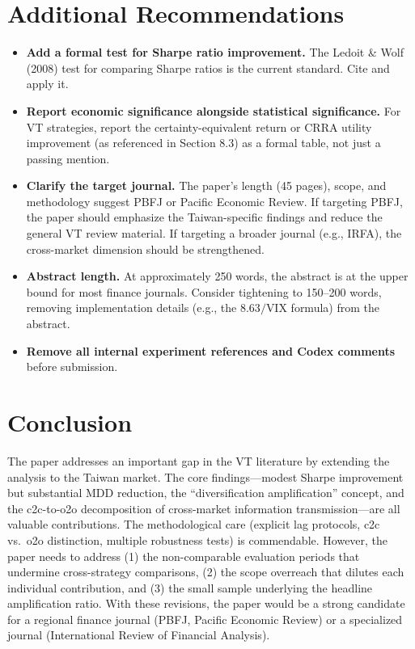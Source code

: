 \documentclass[12pt,a4paper]{article}
\begin{document}
\section{Additional Recommendations}

\begin{itemize}[leftmargin=2em]

\item \textbf{Add a formal test for Sharpe ratio improvement.} The Ledoit \& Wolf (2008) test for comparing Sharpe ratios is the current standard. Cite and apply it.

\item \textbf{Report economic significance alongside statistical significance.} For VT strategies, report the certainty-equivalent return or CRRA utility improvement (as referenced in Section 8.3) as a formal table, not just a passing mention.

\item \textbf{Clarify the target journal.} The paper's length (45 pages), scope, and methodology suggest PBFJ or Pacific Economic Review. If targeting PBFJ, the paper should emphasize the Taiwan-specific findings and reduce the general VT review material. If targeting a broader journal (e.g., IRFA), the cross-market dimension should be strengthened.

\item \textbf{Abstract length.} At approximately 250 words, the abstract is at the upper bound for most finance journals. Consider tightening to 150--200 words, removing implementation details (e.g., the $8.63/\text{VIX}$ formula) from the abstract.

\item \textbf{Remove all internal experiment references and Codex comments} before submission.

\end{itemize}

\section{Conclusion}

The paper addresses an important gap in the VT literature by extending the analysis to the Taiwan market. The core findings---modest Sharpe improvement but substantial MDD reduction, the ``diversification amplification'' concept, and the c2c-to-o2o decomposition of cross-market information transmission---are all valuable contributions. The methodological care (explicit lag protocols, c2c vs.\ o2o distinction, multiple robustness tests) is commendable. However, the paper needs to address (1) the non-comparable evaluation periods that undermine cross-strategy comparisons, (2) the scope overreach that dilutes each individual contribution, and (3) the small sample underlying the headline amplification ratio. With these revisions, the paper would be a strong candidate for a regional finance journal (PBFJ, Pacific Economic Review) or a specialized journal (International Review of Financial Analysis).
\end{document}
